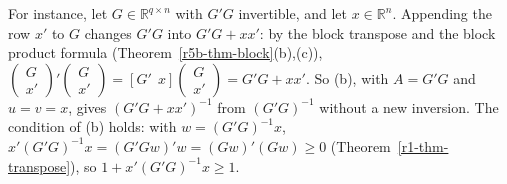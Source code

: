\documentclass[12pt]{article}
\newcommand{\R}{\mathbb R}
\theoremstyle{definition}
\begin{document}
For instance, let \(G\in\R^{q\times n}\) with \(G'G\) invertible, and let \(x\in\R^n\). Appending the row \(x'\) to \(G\)
changes \(G'G\) into \(G'G+xx'\): by the block transpose and the block product formula
(Theorem~\ref{r5b-thm-block}(b),(c)),
\(\left(\begin{smallmatrix}G\\x'\end{smallmatrix}\right)'\left(\begin{smallmatrix}G\\x'\end{smallmatrix}\right)
=[G'\ \ x]\left(\begin{smallmatrix}G\\x'\end{smallmatrix}\right)=G'G+xx'\). So (b), with \(A=G'G\) and \(u=v=x\), gives
\((G'G+xx')^{-1}\) from \((G'G)^{-1}\) without a new inversion. The condition of (b) holds: with \(w=(G'G)^{-1}x\),
\(x'(G'G)^{-1}x=(G'Gw)'w=(Gw)'(Gw)\geqslant0\) (Theorem~\ref{r1-thm-transpose}), so \(1+x'(G'G)^{-1}x\geqslant1\).
\end{document}
